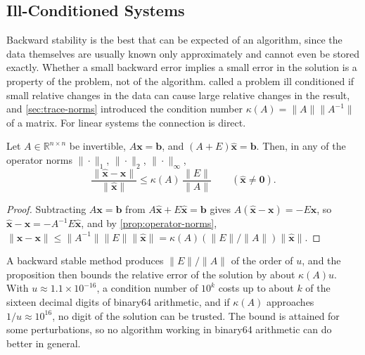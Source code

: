 \subsection{Ill-Conditioned Systems}

Backward stability is the best that can be expected of an algorithm, since the data themselves are usually known only approximately and cannot even be stored exactly. Whether a small backward error implies a small error in the solution is a property of the problem, not of the algorithm.  called a problem ill conditioned if small relative changes in the data can cause large relative changes in the result, and \cref{sec:trace-norms} introduced the condition number $\kappa(A)=\|A\|\|A^{-1}\|$ of a matrix. For linear systems the connection is direct.

\begin{proposition}
\label{prop:perturbed-solution}
Let $A\in\mathbb R^{n\times n}$ be invertible, $A\mathbf x=\mathbf b$, and $(A+E)\hat{\mathbf x}=\mathbf b$. Then, in any of the operator norms $\|\cdot\|_1$, $\|\cdot\|_2$, $\|\cdot\|_\infty$,
\[
\frac{\|\hat{\mathbf x}-\mathbf x\|}{\|\hat{\mathbf x}\|}\le\kappa(A)\,\frac{\|E\|}{\|A\|}\qquad(\hat{\mathbf x}\ne\mathbf 0).
\]
\end{proposition}

\begin{proof}
Subtracting $A\mathbf x=\mathbf b$ from $A\hat{\mathbf x}+E\hat{\mathbf x}=\mathbf b$ gives $A(\hat{\mathbf x}-\mathbf x)=-E\hat{\mathbf x}$, so $\hat{\mathbf x}-\mathbf x=-A^{-1}E\hat{\mathbf x}$, and by \cref{prop:operator-norms}, $\|\hat{\mathbf x}-\mathbf x\|\le\|A^{-1}\|\|E\|\|\hat{\mathbf x}\|=\kappa(A)(\|E\|/\|A\|)\|\hat{\mathbf x}\|$.
\end{proof}

A backward stable method produces $\|E\|/\|A\|$ of the order of $u$, and the proposition then bounds the relative error of the solution by about $\kappa(A)u$. With $u\approx1.1\times10^{-16}$, a condition number of $10^k$ costs up to about $k$ of the sixteen decimal digits of binary64 arithmetic, and if $\kappa(A)$ approaches $1/u\approx10^{16}$, no digit of the solution can be trusted. The bound is attained for some perturbations, so no algorithm working in binary64 arithmetic can do better in general.

